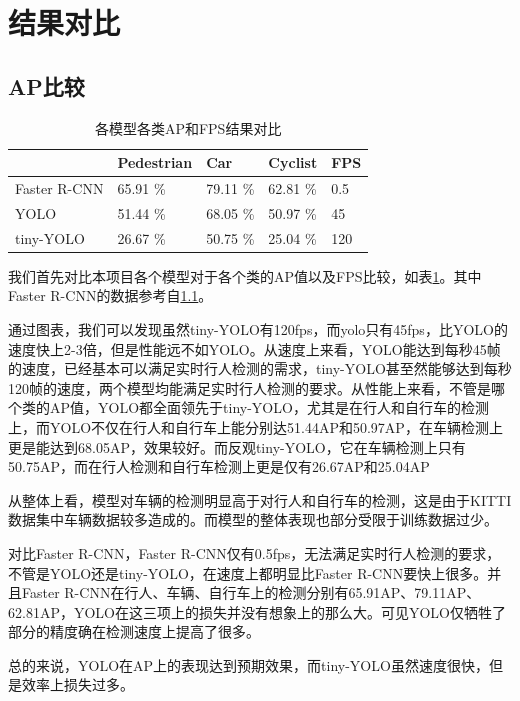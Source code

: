 \section{结果对比}{
	\subsection{AP比较}
	\begin{table}  
	\caption{各模型各类AP和FPS结果对比}  
	\begin{tabular}{l|p{2cm}p{2cm}p{2cm}p{2cm}}  
	\hline  
	             & Pedestrian & Car      & Cyclist  & FPS \\  
	\hline  
	Faster R-CNN & 65.91 \%   & 79.11 \% & 62.81 \% & 0.5 \\  
	YOLO         & 51.44 \%   & 68.05 \% & 50.97 \% & 45  \\
	tiny-YOLO    & 26.67 \%   & 50.75 \% & 25.04 \% & 120  \\
	\hline
	\end{tabular}
	\label{AP}
	\end{table} 
	我们首先对比本项目各个模型对于各个类的AP值以及FPS比较，如表\ref{AP}。其中Faster R-CNN的数据参考自\ref{}。

	通过图表，我们可以发现虽然tiny-YOLO有120fps，而yolo只有45fps，比YOLO的速度快上2-3倍，但是性能远不如YOLO。从速度上来看，YOLO能达到每秒45帧的速度，已经基本可以满足实时行人检测的需求，tiny-YOLO甚至然能够达到每秒120帧的速度，两个模型均能满足实时行人检测的要求。从性能上来看，不管是哪个类的AP值，YOLO都全面领先于tiny-YOLO，尤其是在行人和自行车的检测上，而YOLO不仅在行人和自行车上能分别达51.44AP和50.97AP，在车辆检测上更是能达到68.05AP，效果较好。而反观tiny-YOLO，它在车辆检测上只有50.75AP，而在行人检测和自行车检测上更是仅有26.67AP和25.04AP

	从整体上看，模型对车辆的检测明显高于对行人和自行车的检测，这是由于KITTI数据集中车辆数据较多造成的。而模型的整体表现也部分受限于训练数据过少。

	对比Faster R-CNN，Faster R-CNN仅有0.5fps，无法满足实时行人检测的要求，不管是YOLO还是tiny-YOLO，在速度上都明显比Faster R-CNN要快上很多。并且Faster R-CNN在行人、车辆、自行车上的检测分别有65.91AP、79.11AP、62.81AP，YOLO在这三项上的损失并没有想象上的那么大。可见YOLO仅牺牲了部分的精度确在检测速度上提高了很多。

	总的来说，YOLO在AP上的表现达到预期效果，而tiny-YOLO虽然速度很快，但是效率上损失过多。

}
